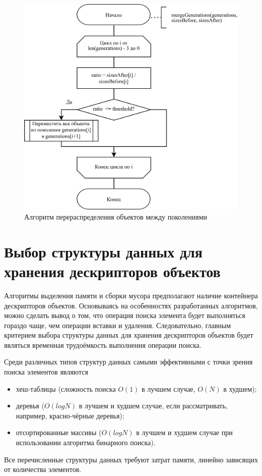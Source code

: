 \begin{figure}[H]
	\centering
	\includegraphics[scale=0.185]{assets/relocate.png}
	\caption{Алгоритм перераспределения объектов между поколениями}
	\label{fig:relocate}
\end{figure}




\section{Выбор структуры данных для хранения дескрипторов объектов}

Алгоритмы выделения памяти и сборки мусора предполагают наличие контейнера дескрипторов объектов. Основываясь на особенностях разработанных алгоритмов, можно сделать вывод о том, что операция поиска элемента будет выполняться гораздо чаще, чем операции вставки и удаления. Следовательно, главным критерием выбора структуры данных для хранения дескрипторов объектов будет являться временная трудоёмкость выполнения операции поиска.

Среди различных типов структур данных самыми эффективными с точки зрения поиска элементов являются
\begin{itemize}[label*=---]
	\item хеш-таблицы (сложность поиска $O(1)$ в лучшем случае, $O(N)$ в худшем);
	\item деревья ($O(log N)$ в лучшем и худшем случае, если рассматривать, например, красно-чёрные деревья);
	\item отсортированные массивы ($O(log N)$ в лучшем и худшем случае при использовании алгоритма бинарного поиска).
\end{itemize}
Все перечисленные структуры данных требуют затрат памяти, линейно зависящих от количества элементов.

